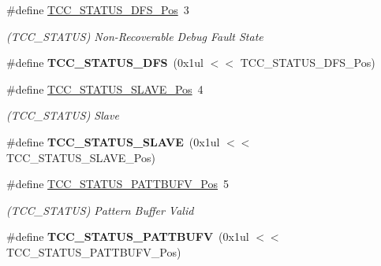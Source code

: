 \begin{DoxyCompactItemize}
\item 
\hypertarget{group___s_a_m_l21___t_c_c_ga984c614e3ddb26f8fae0037304ca4b98}{}\#define \hyperlink{group___s_a_m_l21___t_c_c_ga984c614e3ddb26f8fae0037304ca4b98}{T\+C\+C\+\_\+\+S\+T\+A\+T\+U\+S\+\_\+\+D\+F\+S\+\_\+\+Pos}~3\label{group___s_a_m_l21___t_c_c_ga984c614e3ddb26f8fae0037304ca4b98}

\begin{DoxyCompactList}\small\item\em (T\+C\+C\+\_\+\+S\+T\+A\+T\+U\+S) Non-\/\+Recoverable Debug Fault State \end{DoxyCompactList}\item 
\hypertarget{group___s_a_m_l21___t_c_c_gac1cb6ad3d3da2c371f088fbc426ceaad}{}\#define {\bfseries T\+C\+C\+\_\+\+S\+T\+A\+T\+U\+S\+\_\+\+D\+F\+S}~(0x1ul $<$$<$ T\+C\+C\+\_\+\+S\+T\+A\+T\+U\+S\+\_\+\+D\+F\+S\+\_\+\+Pos)\label{group___s_a_m_l21___t_c_c_gac1cb6ad3d3da2c371f088fbc426ceaad}

\item 
\hypertarget{group___s_a_m_l21___t_c_c_ga662ec37dd9684d20a9cfd8a6a0760fd1}{}\#define \hyperlink{group___s_a_m_l21___t_c_c_ga662ec37dd9684d20a9cfd8a6a0760fd1}{T\+C\+C\+\_\+\+S\+T\+A\+T\+U\+S\+\_\+\+S\+L\+A\+V\+E\+\_\+\+Pos}~4\label{group___s_a_m_l21___t_c_c_ga662ec37dd9684d20a9cfd8a6a0760fd1}

\begin{DoxyCompactList}\small\item\em (T\+C\+C\+\_\+\+S\+T\+A\+T\+U\+S) Slave \end{DoxyCompactList}\item 
\hypertarget{group___s_a_m_l21___t_c_c_ga72f109e95fd88251ebacd4ff669103ff}{}\#define {\bfseries T\+C\+C\+\_\+\+S\+T\+A\+T\+U\+S\+\_\+\+S\+L\+A\+V\+E}~(0x1ul $<$$<$ T\+C\+C\+\_\+\+S\+T\+A\+T\+U\+S\+\_\+\+S\+L\+A\+V\+E\+\_\+\+Pos)\label{group___s_a_m_l21___t_c_c_ga72f109e95fd88251ebacd4ff669103ff}

\item 
\hypertarget{group___s_a_m_l21___t_c_c_ga40edd1ba9353ac785e4d35d82ef087c6}{}\#define \hyperlink{group___s_a_m_l21___t_c_c_ga40edd1ba9353ac785e4d35d82ef087c6}{T\+C\+C\+\_\+\+S\+T\+A\+T\+U\+S\+\_\+\+P\+A\+T\+T\+B\+U\+F\+V\+\_\+\+Pos}~5\label{group___s_a_m_l21___t_c_c_ga40edd1ba9353ac785e4d35d82ef087c6}

\begin{DoxyCompactList}\small\item\em (T\+C\+C\+\_\+\+S\+T\+A\+T\+U\+S) Pattern Buffer Valid \end{DoxyCompactList}\item 
\hypertarget{group___s_a_m_l21___t_c_c_gabbbcb22d779b5b1e92b13dfdc5f58400}{}\#define {\bfseries T\+C\+C\+\_\+\+S\+T\+A\+T\+U\+S\+\_\+\+P\+A\+T\+T\+B\+U\+F\+V}~(0x1ul $<$$<$ T\+C\+C\+\_\+\+S\+T\+A\+T\+U\+S\+\_\+\+P\+A\+T\+T\+B\+U\+F\+V\+\_\+\+Pos)\label{group___s_a_m_l21___t_c_c_gabbbcb22d779b5b1e92b13dfdc5f58400}


\end{DoxyCompactItemize}
